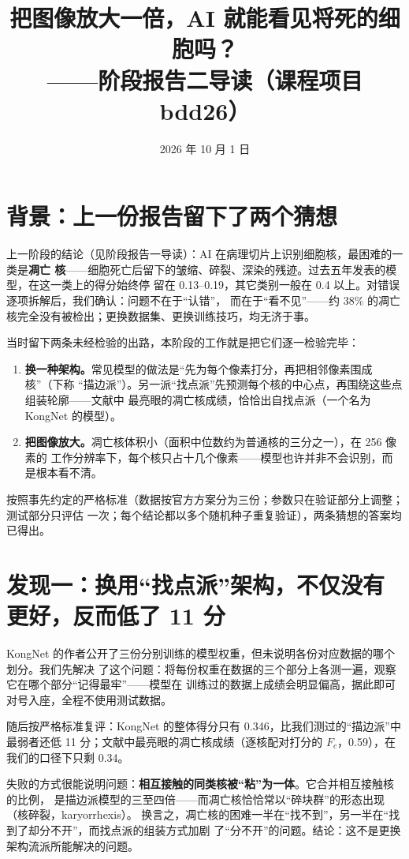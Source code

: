 \documentclass[11pt]{article}
\title{\bfseries 把图像放大一倍，AI 就能看见将死的细胞吗？\\[6pt]
\large ——阶段报告二导读（课程项目 bdd26）}
\author{}
\date{2026 年 10 月 1 日}
\begin{document}
\maketitle


\section*{背景：上一份报告留下了两个猜想}

上一阶段的结论（见阶段报告一导读）：AI 在病理切片上识别细胞核，最困难的一类是\textbf{凋亡
核}——细胞死亡后留下的皱缩、碎裂、深染的残迹。过去五年发表的模型，在这一类上的得分始终停
留在 0.13--0.19，其它类别一般在 0.4 以上。对错误逐项拆解后，我们确认：问题不在于“认错”，
而在于“看不见”——约 38\% 的凋亡核完全没有被检出；更换数据集、更换训练技巧，均无济于事。

当时留下两条未经检验的出路，本阶段的工作就是把它们逐一检验完毕：

\begin{enumerate}
\item \textbf{换一种架构。}常见模型的做法是“先为每个像素打分，再把相邻像素围成核”（下称
      “描边派”）。另一派“找点派”先预测每个核的中心点，再围绕这些点组装轮廓——文献中
      最亮眼的凋亡核成绩，恰恰出自找点派（一个名为 KongNet 的模型）。
\item \textbf{把图像放大。}凋亡核体积小（面积中位数约为普通核的三分之一），在 256 像素的
      工作分辨率下，每个核只占十几个像素——模型也许并非不会识别，而是根本看不清。
\end{enumerate}

按照事先约定的严格标准（数据按官方方案分为三份；参数只在验证部分上调整；测试部分只评估
一次；每个结论都以多个随机种子重复验证），两条猜想的答案均已得出。

\section*{发现一：换用“找点派”架构，不仅没有更好，反而低了 11 分}

KongNet 的作者公开了三份分别训练的模型权重，但未说明各份对应数据的哪个划分。我们先解决
了这个问题：将每份权重在数据的三个部分上各测一遍，观察它在哪个部分“记得最牢”——模型在
训练过的数据上成绩会明显偏高，据此即可对号入座，全程不使用测试数据。

随后按严格标准复评：KongNet 的整体得分只有 0.346，比我们测过的“描边派”中最弱者还低
11 分；文献中最亮眼的凋亡核成绩（逐核配对打分的 $F_c$，0.59），在我们的口径下只剩 0.34。

失败的方式很能说明问题：\textbf{相互接触的同类核被“粘”为一体}。它合并相互接触核的比例，
是描边派模型的三至四倍——而凋亡核恰恰常以“碎块群”的形态出现（核碎裂，karyorrhexis）。
换言之，凋亡核的困难一半在“找不到”，另一半在“找到了却分不开”，而找点派的组装方式加剧
了“分不开”的问题。结论：这不是更换架构流派所能解决的问题。
\end{document}
